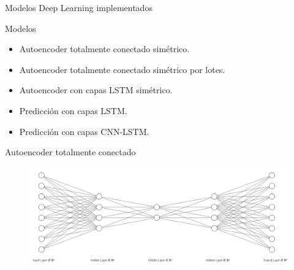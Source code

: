 \documentclass[10pt]{beamer}
\begin{document}
\begin{frame}[fragile]{Modelos Deep Learning implementados}
	\vspace{10px}
	\pause
	
	\begin{block}{Modelos}
		\begin{itemize}
			\item Autoencoder totalmente conectado simétrico.
			\pause
			\item Autoencoder totalmente conectado simétrico por lotes.
			\pause
			\item Autoencoder con capas LSTM simétrico.
			\pause
			\item Predicción con capas LSTM.
			\pause
			\item Predicción con capas CNN-LSTM.
		\end{itemize}
	\end{block}
	
\end{frame}

\begin{frame}[fragile]{Autoencoder totalmente conectado}
	\vspace{10px}
	\pause
	
	\begin{figure}[H]
		\centering
		\includegraphics[scale=0.29]{Imagenes/autoencoder-fcc.png}
	\end{figure}
	
\end{frame}
\end{document}
